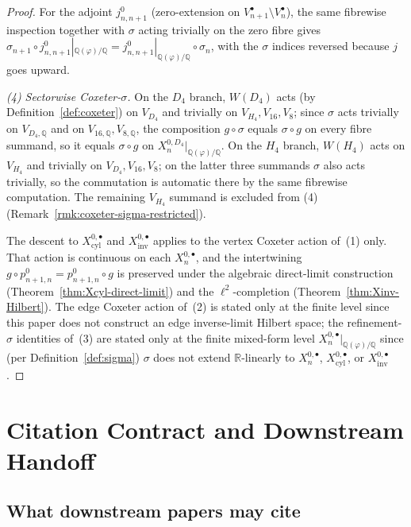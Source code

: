 \documentclass[11pt, a4paper]{amsart}
\theoremstyle{definition}
\newcommand{\R}{\mathbb{R}}
\newcommand{\Q}{\mathbb{Q}}
\newcommand{\inv}{\mathrm{inv}}
\newcommand{\cyl}{\mathrm{cyl}}
\begin{document}
\begin{proof}
For the adjoint $j_{n, n+1}^0$ (zero-extension on
$V_{n+1}^\bullet \setminus V_n^\bullet$), the same fibrewise
inspection together with $\sigma$ acting trivially on the zero
fibre gives
$\sigma_{n+1} \circ j_{n, n+1}^0|_{\Q(\varphi)/\Q}
= j_{n, n+1}^0|_{\Q(\varphi)/\Q} \circ \sigma_n$, with the
$\sigma$ indices reversed because $j$ goes upward.

\emph{(4) Sectorwise Coxeter-$\sigma$.}
On the $D_4$ branch, $W(D_4)$ acts (by Definition~\ref{def:coxeter})
on $V_{D_4}$ and trivially on $V_{H_4}, V_{16}, V_8$; since $\sigma$
acts trivially on $V_{D_4, \Q}$ and on $V_{16, \Q}, V_{8, \Q}$, the
composition $g \circ \sigma$ equals $\sigma \circ g$ on every fibre
summand, so it equals $\sigma \circ g$ on
$X_n^{0, D_4}|_{\Q(\varphi)/\Q}$. On the $H_4$ branch, $W(H_4)$ acts
on $V_{H_4}$ and trivially on $V_{D_4}, V_{16}, V_8$; on the latter
three summands $\sigma$ also acts trivially, so the commutation is
automatic there by the same fibrewise computation. The remaining
$V_{H_4}$ summand is excluded from (4)
(Remark~\ref{rmk:coxeter-sigma-restricted}).

The descent to $X_\cyl^{0, \bullet}$ and $X_\inv^{0, \bullet}$
applies to the vertex Coxeter action of~(1) only. That action is
continuous on each $X_n^{0, \bullet}$, and the intertwining
$g \circ p_{n+1, n}^0 = p_{n+1, n}^0 \circ g$ is preserved under
the algebraic direct-limit construction
(Theorem~\ref{thm:Xcyl-direct-limit}) and the $\ell^2$-completion
(Theorem~\ref{thm:Xinv-Hilbert}). The edge Coxeter action of~(2)
is stated only at the finite level since this paper does not
construct an edge inverse-limit Hilbert space; the
refinement-$\sigma$ identities of~(3) are stated only at the
finite mixed-form level $X_n^{0, \bullet}|_{\Q(\varphi)/\Q}$
since (per Definition~\ref{def:sigma}) $\sigma$ does not extend
$\R$-linearly to $X_n^{0, \bullet}$, $X_\cyl^{0, \bullet}$, or
$X_\inv^{0, \bullet}$.
\end{proof}

\section{Citation Contract and Downstream Handoff}
\label{sec:handoff}

\subsection{What downstream papers may cite}
\end{document}
